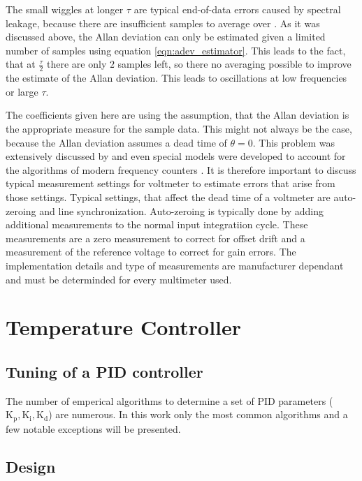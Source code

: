 \clearpage
{}

The small wiggles at longer $\tau$ are typical end-of-data errors caused by spectral leakage, because there are insufficient samples to average over \cite{adev_long_tau}. As it was discussed above, the Allan deviation can only be estimated given a limited number of samples using equation \ref{eqn:adev_estimator}. This leads to the fact, that at $\frac{\tau}{2}$ there are only $2$ samples left, so there no averaging possible to improve the estimate of the Allan deviation. This leads to oscillations at low frequencies or large $\tau$.



The coefficients given here are using the assumption, that the Allan deviation is the appropriate measure for the sample data. This might not always be the case, because the Allan deviation assumes a dead time of $\theta = 0$. This problem was extensively discussed by \citeauthor{psd_to_adev} \cite{psd_to_adev} and even special models were developed to account for the algorithms of modern frequency counters \cite{adev_frequency_counter}. It is therefore important to discuss typical measurement settings for voltmeter to estimate errors that arise from those settings. Typical settings, that affect the dead time of a voltmeter are auto-zeroing and line synchronization. Auto-zeroing is typically done by adding additional measurements to the normal input integratiion cycle. These measurements are a zero measurement to correct for offset drift and a measurement of the reference voltage to correct for gain errors. The implementation details and type of measurements are manufacturer dependant and must be determinded for every multimeter used.


\clearpage
\section{Temperature Controller}

\subsection{Tuning of a PID controller}
The number of emperical algorithms to determine a set of PID parameters ($\mathrm{K_p, K_i, K_d}$) are numerous. In this work only the most common algorithms and a few notable exceptions will be presented.
\subsection{Design}
